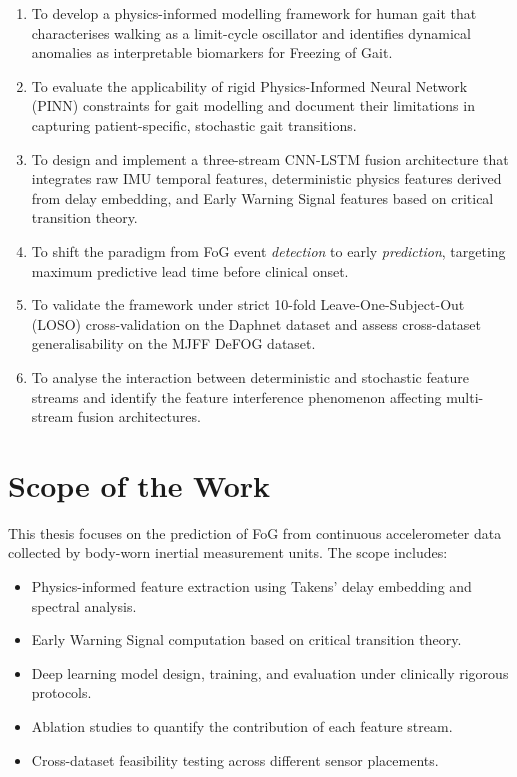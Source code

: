 \documentclass[12pt,a4paper,oneside]{report}
\numberwithin{equation}{chapter}
\numberwithin{figure}{chapter}
\numberwithin{table}{chapter}
\begin{document}
\begin{enumerate}[leftmargin=*, itemsep=4pt]
  \item To develop a physics-informed modelling framework for human gait that characterises walking as a limit-cycle oscillator and identifies dynamical anomalies as interpretable biomarkers for Freezing of Gait.

  \item To evaluate the applicability of rigid Physics-Informed Neural Network (PINN) constraints for gait modelling and document their limitations in capturing patient-specific, stochastic gait transitions.

  \item To design and implement a three-stream CNN-LSTM fusion architecture that integrates raw IMU temporal features, deterministic physics features derived from delay embedding, and Early Warning Signal features based on critical transition theory.

  \item To shift the paradigm from FoG event \textit{detection} to early \textit{prediction}, targeting maximum predictive lead time before clinical onset.

  \item To validate the framework under strict 10-fold Leave-One-Subject-Out (LOSO) cross-validation on the Daphnet dataset and assess cross-dataset generalisability on the MJFF DeFOG dataset.

  \item To analyse the interaction between deterministic and stochastic feature streams and identify the feature interference phenomenon affecting multi-stream fusion architectures.
\end{enumerate}

\section{Scope of the Work}

This thesis focuses on the prediction of FoG from continuous accelerometer data collected by body-worn inertial measurement units. The scope includes:

\begin{itemize}[leftmargin=*, itemsep=3pt]
  \item Physics-informed feature extraction using Takens' delay embedding and spectral analysis.
  \item Early Warning Signal computation based on critical transition theory.
  \item Deep learning model design, training, and evaluation under clinically rigorous protocols.
  \item Ablation studies to quantify the contribution of each feature stream.
  \item Cross-dataset feasibility testing across different sensor placements.
\end{itemize}
\end{document}
